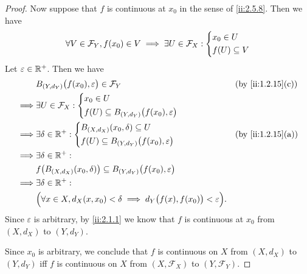 \begin{proof}
  Now suppose that \(f\) is continuous at \(x_0\) in the sense of \cref{ii:2.5.8}.
  Then we have
  \[
    \forall V \in \mathcal{F}_Y, f(x_0) \in V \implies \exists U \in \mathcal{F}_X : \begin{dcases}
      x_0 \in U \\
      f(U) \subseteq V
    \end{dcases}
  \]
  Let \(\varepsilon \in \mathbb{R}^+\).
  Then we have
  \begin{align*}
             & B_{(Y, d_Y)}\big(f(x_0), \varepsilon\big) \in \mathcal{F}_Y                                       &  & \by{ii:1.2.15}[c] \\
    \implies & \exists U \in \mathcal{F}_X : \begin{dcases}
                                               x_0 \in U \\
                                               f(U) \subseteq B_{(Y, d_Y)}\big(f(x_0), \varepsilon\big)
                                             \end{dcases}                                 \\
    \implies & \exists \delta \in \R^+ : \begin{dcases}
                                           B_{(X, d_X)}(x_0, \delta) \subseteq U \\
                                           f(U) \subseteq B_{(Y, d_Y)}\big(f(x_0), \varepsilon\big)
                                         \end{dcases}                                          &  & \by{ii:1.2.15}[a]                   \\
    \implies & \exists \delta \in \R^+ :                                                                                             \\
             & f\big(B_{(X, d_X)}(x_0, \delta)\big) \subseteq B_{(Y, d_Y)}\big(f(x_0), \varepsilon\big)                              \\
    \implies & \exists \delta \in \R^+ :                                                                                             \\
             & \Big(\forall x \in X, d_X(x, x_0) < \delta \implies d_Y\big(f(x), f(x_0)\big) < \varepsilon\Big).
  \end{align*}
  Since \(\varepsilon\) is arbitrary, by \cref{ii:2.1.1} we know that \(f\) is continuous at \(x_0\) from \((X, d_X)\) to \((Y, d_Y)\).

  Since \(x_0\) is arbitrary, we conclude that \(f\) is continuous on \(X\) from \((X, d_X)\) to \((Y, d_Y)\) iff \(f\) is continuous on \(X\) from \((X, \mathcal{F}_X)\) to \((Y, \mathcal{F}_Y)\).
\end{proof}

